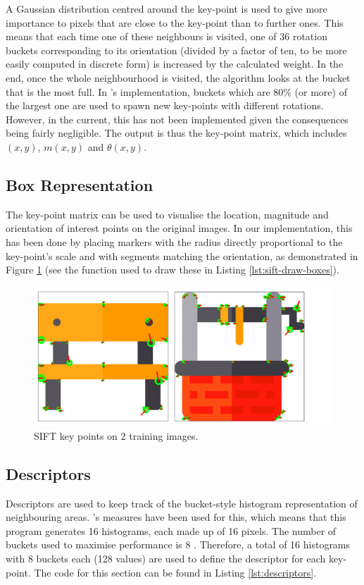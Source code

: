 \documentclass[a4paper,11pt,twocolumn]{article}
\begin{document}
A Gaussian distribution centred around the key-point is used to give more importance to pixels that are close to the key-point than to further ones. This means that each time one of these neighbours is visited, one of 36 rotation buckets corresponding to its orientation (divided by a factor of ten, to be more easily computed in discrete form) is increased by the calculated weight. In the end, once the whole neighbourhood is visited, the algorithm looks at the bucket that is the most full. In \citet{lowe2004distinctive}'s implementation, buckets which are 80\% (or more) of the largest one are used to spawn new key-points with different rotations. However, in the current, this has not been implemented given the consequences being fairly negligible. The output is thus the key-point matrix, which includes $(x, y)$, $m(x, y)$ and $\theta(x, y)$.

\subsection{Box Representation}
The key-point matrix can be used to visualise the location, magnitude and orientation of interest points on the original images. In our implementation, this has been done by placing markers with the radius directly proportional to the key-point's scale and with segments matching the orientation, as demonstrated in Figure \ref{fig:sift-key-points} (see the function used to draw these in Listing \ref{lst:sift-draw-boxes}).

\begin{figure}[!htbp]
\centering
\includegraphics[scale=0.12]{figures/sift-key-points.png}
\caption{SIFT key points on 2 training images.}
\label{fig:sift-key-points} 
\end{figure}

\subsection{Descriptors}
Descriptors are used to keep track of the bucket-style histogram representation of neighbouring areas. \citet{lowe2004distinctive}'s measures have been used for this, which means that this program generates 16 histograms, each made up of 16 pixels. The number of buckets used to maximise performance is 8 \citep{lowe2004distinctive}. Therefore, a total of 16 histograms with 8 buckets each (128 values) are used to define the descriptor for each key-point. The code for this section can be found in Listing \ref{lst:descriptors}.
\end{document}
